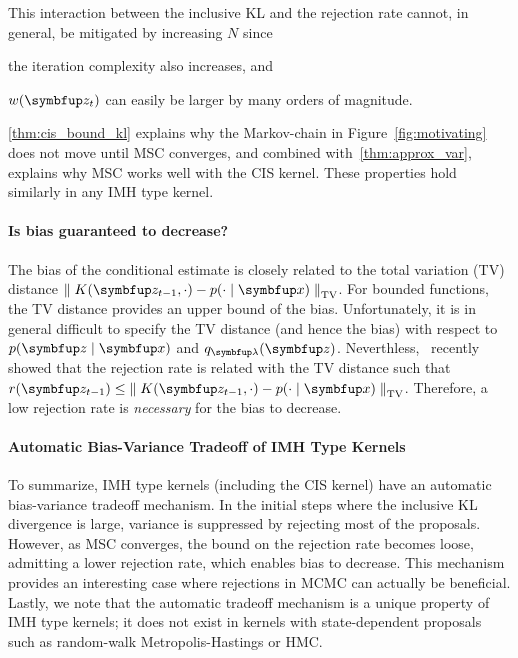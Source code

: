 This interaction between the inclusive KL and the rejection rate cannot, in general, be mitigated by increasing \(N\) since
\begin{enumerate*}[label=(\roman*)]
  \item the iteration complexity also increases, and
  \item \(w(\vz_t)\) can easily be larger by many orders of magnitude.
\end{enumerate*}
\cref{thm:cis_bound_kl} explains why the Markov-chain in Figure~\ref{fig:motivating} does not move until MSC converges, and combined with~\cref{thm:approx_var}, explains why MSC works well with the CIS kernel.
These properties hold similarly in any IMH type kernel.

\vspace{-0.1in}
\paragraph{Is bias guaranteed to decrease?}
The bias of the conditional estimate is closely related to the total variation (TV) distance \(\DTV{K(\vz_{t-1}, \cdot)}{p(\cdot\mid\vx)}\).
For bounded functions, the TV distance provides an upper bound of the bias.
Unfortunately, it is in general difficult to specify the TV distance (and hence the bias) with respect to \(p(\vz\mid\vx)\) and \(q_{\vlambda}(\vz)\).
Neverthless,~\citet{wang_exact_2020} recently showed that the rejection rate is related with the TV distance such that \(r(\vz_{t-1}) \leq \DTV{K(\vz_{t-1}, \cdot)}{p(\cdot\mid\vx)}\).
Therefore, a low rejection rate is \textit{necessary} for the bias to decrease.

\vspace{-0.1in}
\paragraph{Automatic Bias-Variance Tradeoff of IMH Type Kernels}
To summarize, IMH type kernels (including the CIS kernel) have an automatic bias-variance tradeoff mechanism.
In the initial steps where the inclusive KL divergence is large, variance is suppressed by rejecting most of the proposals.
However, as MSC converges, the bound on the rejection rate becomes loose, admitting a lower rejection rate, which enables bias to decrease.
This mechanism provides an interesting case where rejections in MCMC can actually be beneficial.
Lastly, we note that the automatic tradeoff mechanism is a unique property of IMH type kernels; it does not exist in kernels with state-dependent proposals such as random-walk Metropolis-Hastings or HMC.

